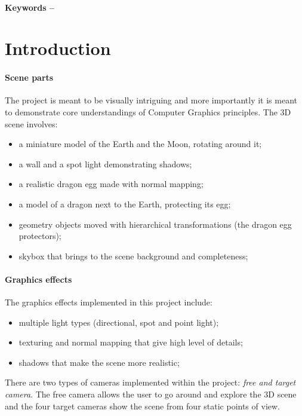 \documentclass[10pt, a4paper]{article}
\title{\mytitle}
\author{\myauthor\hspace{1em}\\\contact\\Edinburgh Napier University\hspace{0.5em}-\hspace{0.5em}\mymodule}
\date{}
\begin{document}
	
	\maketitle
	\begin{abstract}
		 The aim of this project is to create a realistic 3D scene, rendered in real-time. The project is inspired by the series \textit{Games of Thrones}\cite{dragons} and previous years projects found on the games website of Napier University. A wide variety of graphics techniques were used to create the 3D scene, from multiple lights and light types to shadowing, material shading and transform hierarchy. This report covers how te scene was implemented and what future work is considered.
	\end{abstract}
	\\
	\textbf{Keywords -- }{\mykeywords}
	\section{Introduction}
    \paragraph{Scene parts} The project is meant to be visually intriguing and more importantly it is meant to demonstrate core understandings of Computer Graphics principles. The 3D scene involves:   
    \begin{itemize}
    	\item a miniature model of the Earth and the Moon, rotating around it;
    	\item a wall and a spot light demonstrating shadows;
    	\item a realistic dragon egg made with normal mapping;
    	\item a model of a dragon next to the Earth, protecting its egg;
    	\item geometry objects moved with hierarchical transformations (the dragon egg protectors);
    	\item skybox that brings to the scene background and completeness;
    \end{itemize}
    
    
	\paragraph{Graphics effects}The graphics effects implemented in this project include:
	\begin{itemize}
		\item multiple light types (directional, spot and point light);
		\item texturing and normal mapping that give high level of details;
		\item shadows that make the scene more realistic;
	\end{itemize}
    There are two types of cameras implemented within the project: \textit{free and target camera}. The free camera allows the user to go around and explore the 3D scene and the four target cameras show the scene from four static points of view.
    
\end{document}
